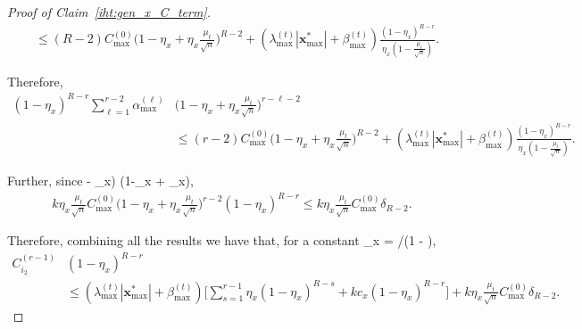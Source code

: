 \documentclass{article}
\def\[#1\]{{$#1$}}
\def\b#1{{\mathbf{#1}}}
\begin{document}
\begin{proof}[Proof of Claim~\ref{iht:gen_x_C_term}]
\begin{align*}
	&\leq ({R}-2)  C_{\max}^{(0)} \big(1-\eta_x + \eta_x\tfrac{\mu_t}{\sqrt{n}} \big)^{{R} - 2}  + (\lambda^{(t)}_{\max} |\b{x}_{\max}^*| +\beta^{(t)}_{\max})\tfrac{(1- \eta_x)^{{R} - r}}{\eta_x (1 - \tfrac{\mu_t}{\sqrt{n}})}.
	\end{align*}
	
	Therefore, 
	\begin{align*}
	(1- \eta_x)^{{R} - r } \textstyle\sum\limits_{\ell = 1}^{r-2}  \alpha^{(\ell)}_{\max}&\big(1-\eta_x + \eta_x\tfrac{\mu_t}{\sqrt{n}} \big)^{r -\ell-2}\\
	&\leq (r-2)  C_{\max}^{(0)} \big(1-\eta_x + \eta_x\tfrac{\mu_t}{\sqrt{n}} \big)^{{R} - 2} + (\lambda^{(t)}_{\max} |\b{x}_{\max}^*| +\beta^{(t)}_{\max})\tfrac{(1- \eta_x)^{{R} - r}}{\eta_x (1 - \tfrac{\mu_t}{\sqrt{n}})}.
	\end{align*}
	
	Further, since \[(1- \eta_x) \leq (1-\eta_x + \eta_x)\],
	\begin{align*}
	k\eta_x\tfrac{\mu_t}{\sqrt{n}}C_{\max}^{(0)} \big(1-\eta_x + \eta_x\tfrac{\mu_t}{\sqrt{n}} \big)^{r-2}(1- \eta_x)^{{R} - r} 
	
	\leq k\eta_x\tfrac{\mu_t}{\sqrt{n}}C_{\max}^{(0)} \delta_{{R}-2}.
	\end{align*}
	
	
	
	
	
	
	
	
	
	
	
	Therefore, combining all the results we have that, for a constant 	\[c_x = {}/{(1 - )}\],
	\begin{align*}
	C_{i_2}^{(r-1)} &(1- \eta_x)^{{R} - r}\\
	
	
	&\leq (\lambda^{(t)}_{\max} |\b{x}_{\max}^*| +\beta^{(t)}_{\max}) \bigg[ \textstyle\sum\limits_{s=1}^{r-1}\eta_x(1- \eta_x)^{{R} - s} + 
	kc_x(1- \eta_x)^{{R} - r}\bigg] + k\eta_x\tfrac{\mu_t}{\sqrt{n}}C_{\max}^{(0)} \delta_{{R}-2}.
	\end{align*}
	
\end{proof}
\end{document}
